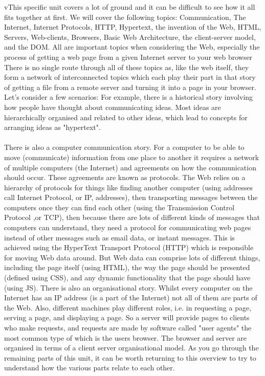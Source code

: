 vThis specific unit covers a lot of ground and it can be difficult to see how it all fits together at first. We will cover the following topics: Communication, The Internet, Internet Protocols, HTTP, Hypertext, the invention of the Web, HTML, Servers, Web-clients, Browsers, Basic Web Architecture, the client-server model, and the DOM. All are important topics when considering the Web, especially the process of getting a web page from a given Internet server to your web browser There is no single route through all of these topics as, like the web itself, they form a network of interconnected topics which each play their part in that story of getting a file from a remote server and turning it into a page in your browser. Let's consider a few scenarios:
For example, there is a historical story involving how people have thought about communicating ideas. Most ideas are hierarchically organised and related to other ideas, which lead to concepts for arranging ideas as "hypertext".

\paragraph{} There is also a computer communication story. For a computer to be able to move (communicate) information from one place to another it requires a network of multiple computers (the Internet) and agreements on how the communication should occur. These agreements are known as protocols. The Web relies on a hierarchy of protocols for things like finding another computer (using addresses call Internet Protocol, or IP, addresses), then transporting messages between the computers once they can find each other (using the Transmission Control Protocol ,or TCP), then because there are lots of different kinds of messages that computers can understand, they need a protocol for communicating web pages instead of other messages such as email data, or instant messages. This is achieved using the HyperText Transport Protocol (HTTP) which is responsible for moving Web data around. But Web data can comprise lots of different things, including the page itself (using HTML), the way the page should be presented (defined using CSS), and any dynamic functionality that the page should have (using JS).
There is also an organisational story. Whilst every computer on the Internet has an IP address (is a part of the Internet) not all of them are parts of the Web. Also, different machines play different roles, i.e. in requesting a page, serving a page, and displaying a page. So a server will provide pages to clients who make requests, and requests are made by software called "user agents" the most common type of which is the users browser. The browser and server are organised in terms of a client server organisational model.
As you go through the remaining parts of this unit, it can be worth returning to this overview to try to understand how the various parts relate to each other.


